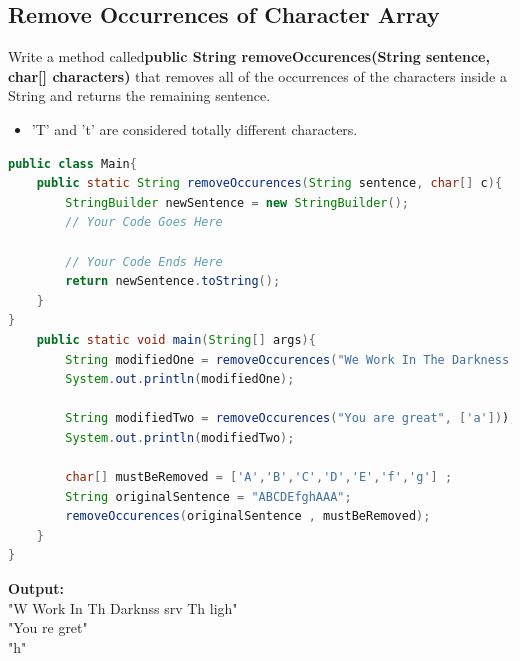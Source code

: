 \documentclass[12pt , a4paper]{article}
\begin{document}
	\subsection{Remove Occurrences of Character Array }
Write a method called\textbf{public String removeOccurences(String sentence, char[] characters)} that removes all of the occurrences of the characters inside a String and returns the remaining sentence.\\


	\begin{importantBox}

		\begin{itemize}
			\item  'T' and 't' are considered totally different characters.
		\end{itemize}
	\end{importantBox}
	\begin{lstlisting}[language=Java]
public class Main{
	public static String removeOccurences(String sentence, char[] c){
		StringBuilder newSentence = new StringBuilder();
		// Your Code Goes Here

		// Your Code Ends Here	
		return newSentence.toString();
	}
}
	public static void main(String[] args){
		String modifiedOne = removeOccurences("We Work In The Darkness To Serve The Light", ['t','e']);
		System.out.println(modifiedOne);

		String modifiedTwo = removeOccurences("You are great", ['a']));
		System.out.println(modifiedTwo);
		
		char[] mustBeRemoved = ['A','B','C','D','E','f','g'] ;
		String originalSentence = "ABCDEfghAAA";
		removeOccurences(originalSentence , mustBeRemoved);
	}
}
	\end{lstlisting}


	\begin{tcolorbox}
	\textbf{Output:}\\
	"W Work In Th Darknss srv Th ligh"\\
	"You re gret"\\
	"h"
	\end{tcolorbox}
\end{document}
